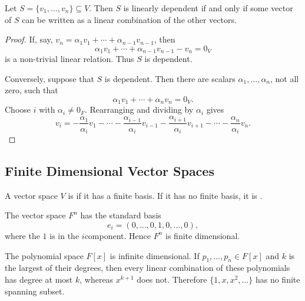 \begin{Theorem}\label{thm:DependentVector}
Let $S=\{v_1,\ldots,v_n\}\subseteq V$. Then $S$ is linearly dependent if and only if some vector of $S$ can be written as a linear combination of the other vectors.
\end{Theorem}
\begin{proof}
If, say, $v_n=\alpha_1v_1+\cdots+\alpha_{n-1}v_{n-1}$, then
\begin{equation*}
\alpha_1v_1+\cdots+\alpha_{n-1}v_{n-1}-v_n=0_V
\end{equation*}
is a non-trivial linear relation. Thus $S$ is dependent.

Conversely, suppose that $S$ is dependent. Then there are scalars $\alpha_1,\ldots,\alpha_n$, not all zero, such that
\begin{equation*}
\alpha_1v_1+\cdots+\alpha_nv_n=0_V.
\end{equation*}
Choose $i$ with $\alpha_i\ne0_F$. Rearranging and dividing by $\alpha_i$ gives
\begin{equation*}
v_i=-\frac{\alpha_1}{\alpha_i}v_1-\cdots-
\frac{\alpha_{i-1}}{\alpha_i}v_{i-1}
-\frac{\alpha_{i+1}}{\alpha_i}v_{i+1}-\cdots-
\frac{\alpha_n}{\alpha_i}v_n.
\end{equation*}
\end{proof}

\subsection{Finite Dimensional Vector Spaces}

\begin{Definition}
A vector space $V$ is  if it has a finite basis. If it has no finite basis, it is .
\end{Definition}

\begin{Example}
The vector space $F^n$ has the standard basis
\begin{equation*}
e_i=(0,\ldots,0,1,0,\ldots,0),
\end{equation*}
where the $1$ is in the $i$\nth component. Hence $F^n$ is finite dimensional.

The polynomial space $F[x]$ is infinite dimensional. If $p_1,\ldots,p_n\in F[x]$ and $k$ is the largest of their degrees, then every linear combination of these polynomials has degree at most $k$, whereas $x^{k+1}$ does not. Therefore $\{1,x,x^2,\ldots\}$ has no finite spanning subset.
\end{Example}

